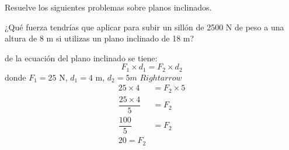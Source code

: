 Resuelve los siguientes problemas sobre planos inclinados.

\begin{parts}


    ¿Qué fuerza tendrías que aplicar para subir un sillón de 2500 N
    de peso a una altura de 8 m si utilizas un plano inclinado de 18 m?

    \begin{solutionbox}{5cm}
        de la ecuación del plano inclinado se tiene:
        \[F_1 \times d_1= F_2 \times d_2\]
        donde $F_1=25$ N, $d_1=4$ m, $d_2=5m$
        $Rightarrow$
        \[
            \begin{array}{lr}
                25 \times 4            & =              F_2 \times 5 \\
                \dfrac{25 \times 4}{5} & =  F_2                      \\
                \dfrac{100}{5}         & =          F_2              \\
                20 = F_2
            \end{array}
        \]
    \end{solutionbox}




\end{parts}
